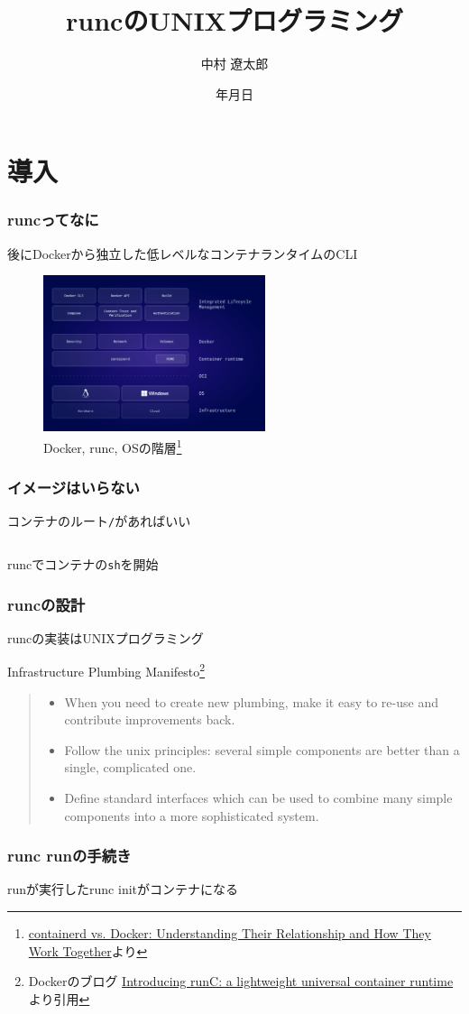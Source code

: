 \documentclass[unicode, 14pt, aspectratio=169]{beamer}
\date{\number\year 年\number\month 月\number\day 日}
\title{runcのUNIXプログラミング}
\author{中村 遼太郎}
\begin{document}
\begin{frame}
\titlepage
\end{frame}
\section{導入}
\begin{frame}[t]
  \frametitle{runcってなに}
  後にDockerから独立した低レベルなコンテナランタイムのCLI
  \begin{figure}
    \centering
    \includegraphics[width=6.5cm]{images/containerd-diagram-v1.png}
    \caption{Docker, runc, OSの階層\footnote{\scriptsize{\href{https://www.docker.com/blog/containerd-vs-docker}{containerd vs. Docker: Understanding Their Relationship and How They Work Together}より}}}
    \label{fig:runc}
  \end{figure}
\end{frame}
\begin{frame}[fragile=singleslide]
  \frametitle{イメージはいらない}
  コンテナのルート\texttt{/}があればいい
  \begin{center}
    \inputminted[fontsize=\footnotesize]{sh}{code/run.sh}
    runcでコンテナの\texttt{sh}を開始\supercite{runc}  
  \end{center}
\end{frame}
\begin{frame}[t]
  \frametitle{runcの設計}
  runcの実装はUNIXプログラミング
  \begin{center}
    Infrastructure Plumbing Manifesto\footnote{\scriptsize{Dockerのブログ \href{https://www.docker.com/blog/runc/}{Introducing runC: a lightweight universal container runtime
}より引用}}
    \end{center}
  \begin{quote}
    \begin{itemize}
    \item {\small When you need to create new plumbing, make it easy to re-use and contribute improvements back.}
    \item {\small Follow the unix principles: several simple components are better than a single, complicated one.}
    \item {\small Define standard interfaces which can be used to combine many simple components into a more sophisticated system.}
  \end{itemize}
  \end{quote}
\end{frame}
\begin{frame}[t]
  \frametitle{runc runの手続き}
  runが実行したrunc initがコンテナになる
\end{frame}
\end{document}
